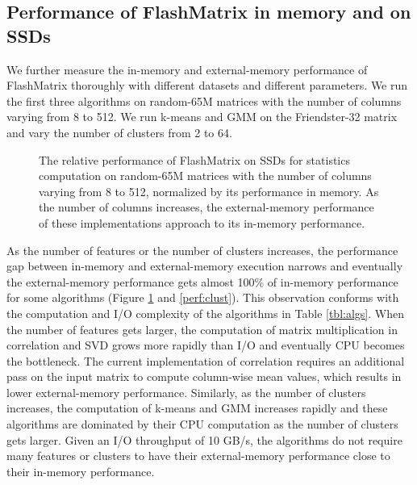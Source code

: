 %		

\subsection{Performance of FlashMatrix in memory and on SSDs}

We further measure the in-memory and external-memory performance of FlashMatrix
thoroughly with different datasets and different parameters. We run the first
three algorithms on random-65M matrices
with the number of columns varying from 8 to 512. We run k-means
and GMM on the Friendster-32 matrix and vary the number of clusters from 2 to 64.

\begin{figure}
	\begin{center}
		\footnotesize
		\vspace{-15pt}
		
		\vspace{-10pt}
		\caption{The relative performance of FlashMatrix on SSDs for
			statistics computation on random-65M matrices with the number of
			columns varying from 8 to 512, normalized by its performance
			in memory. As the number of columns increases, the external-memory
			performance of these implementations approach to its in-memory
		performance.}
		\label{perf:stat}
	\end{center}
\end{figure}

As the number of features or the number of clusters increases,
the performance gap between in-memory and external-memory execution
narrows and eventually the external-memory performance gets almost 100\%
of in-memory performance for some algorithms (Figure \ref{perf:stat} and
\ref{perf:clust}).
This observation conforms with the computation and I/O complexity of
the algorithms in Table \ref{tbl:algs}. When the number of features
gets larger, the computation of matrix multiplication in
correlation and SVD grows more rapidly than I/O and eventually CPU becomes
the bottleneck. The current implementation of correlation requires an additional
pass on the input matrix to compute column-wise mean values, which results in
lower external-memory performance. Similarly, as the number of clusters
increases, the computation of k-means and GMM increases rapidly and
these algorithms are dominated by their CPU computation as the number
of clusters gets larger. Given an I/O throughput of 10 GB/s, the algorithms
do not require many features or clusters to have their external-memory
performance close to their in-memory performance.

